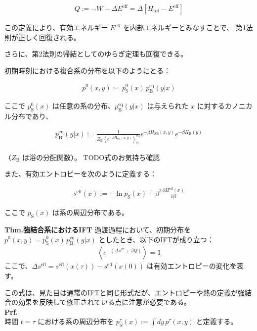 \documentclass[a4paper,11pt]{jsarticle}
\numberwithin{equation}{section}
\begin{document}
\begin{align}
Q := -W - \Delta E^{\mathrm{eff}} = \Delta [H_{\text{tot}} - E^{\mathrm{eff}}]
\end{align}

この定義により、有効エネルギー $E^{\mathrm{eff}}$ を内部エネルギーとみなすことで、
第1法則が正しく回復される。

さらに、第2法則の帰結としてのゆらぎ定理も回復できる。

初期時刻における複合系の分布を以下のようにとる：

\begin{align}
p^0(x, y) := p_{\text{S}}^0(x)\, p_{\text{B}}^{\mathrm{eq}}(y | x)
\end{align}

ここで $p_{\text{S}}^0(x)$ は任意の系の分布、$p_{\text{B}}^{\mathrm{eq}}(y | x)$ は与えられた $x$ に対するカノニカル分布であり、

\begin{align}
p_{\text{B}}^{\mathrm{eq}}(y | x) := \frac{1}{Z_{\text{B}} \left\langle e^{-\beta H_{\text{SB}}(x,y)} \right\rangle_{\text{B}}^{\mathrm{eq}}} e^{-\beta H_{\text{SB}}(x,y)} e^{-\beta H_{\text{B}}(y)}
\end{align}

（$Z_{\text{B}}$ は浴の分配関数）。
TODO式のお気持ち確認

また、有効エントロピーを次のように定義する：

\begin{align}
s^{\mathrm{eff}}(x)
:= - \ln p_{\text{S}}(x) + \beta^2 \frac{\partial H^{\mathrm{eff}}(x)}{\partial \beta}
\end{align}

ここで $p_{\text{S}}(x)$ は系の周辺分布である。

\begin{itembox}[l]{\textbf{Thm.強結合系におけるIFT}}
過渡過程において、初期分布を $p^0(x, y) = p_{\text{S}}^0(x)\, p_{\text{B}}^{\mathrm{eq}}(y | x)$ としたとき、以下のIFTが成り立つ：
\begin{align}
\left\langle e^{ -(\Delta s^{\mathrm{eff}} + \beta Q) } \right\rangle = 1
\end{align}
ここで、$\Delta s^{\mathrm{eff}} = s^{\mathrm{eff}}(x(\tau)) - s^{\mathrm{eff}}(x(0))$ は有効エントロピーの変化を表す。
\end{itembox}
この式は、見た目は通常のIFTと同じ形式だが、エントロピーや熱の定義が強結合の効果を反映して修正されている点に注意が必要である。\\
\textbf{Prf.}\\
時間 $t = \tau$ における系の周辺分布を $p_S^\tau(x) := \int dy\, p^\tau(x, y)$ と定義する。
\end{document}
